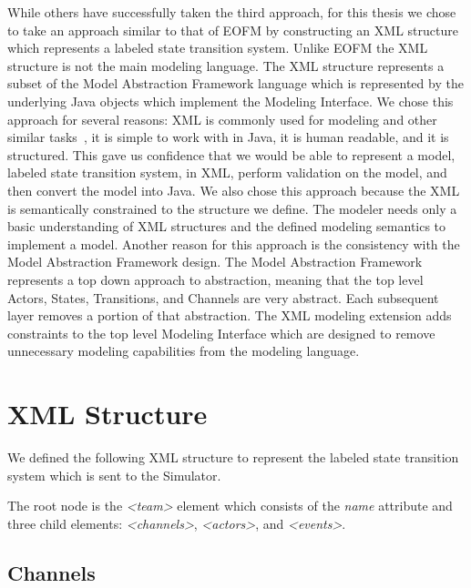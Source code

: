 While others have successfully taken the third approach, for this thesis we chose to take an approach similar to that of EOFM by constructing an XML structure which represents a labeled state transition system.  Unlike EOFM the XML structure is not the main modeling language.  The XML structure represents a subset of the Model Abstraction Framework language which is represented by the underlying Java objects which implement the Modeling Interface.  We chose this approach for several reasons:  XML is commonly used for modeling and other similar tasks~\cite{bolton2009enhanced}, it is simple to work with in Java, it is human readable, and it is structured.  This gave us confidence that we would be able to represent a model, labeled state transition system, in XML, perform validation on the model, and then convert the model into Java.  We also chose this approach because the XML is semantically constrained to the structure we define.  The modeler needs only a basic understanding of XML structures and the defined modeling semantics to implement a model.  Another reason for this approach is the consistency with the Model Abstraction Framework design.  The Model Abstraction Framework represents a top down approach to abstraction, meaning that the top level Actors, States, Transitions, and Channels are very abstract.  Each subsequent layer removes a portion of that abstraction.  The XML modeling extension adds constraints to the top level Modeling Interface which are designed to remove unnecessary modeling capabilities from the modeling language.

\section{XML Structure}

We defined the following XML structure to represent the labeled state transition system which is sent to the Simulator.  

The root node is the {\em \textless team\textgreater} element which consists of the {\em name} attribute and three child elements: {\em \textless channels\textgreater}, {\em \textless actors\textgreater}, and {\em \textless events\textgreater}.

\begin{spacing}{.5}

\end{spacing}

\subsection{Channels}

